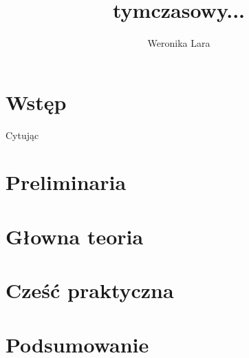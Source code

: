 \documentclass[10pt,a4paper]{report}
\author{Weronika Lara}
\title{tymczasowy...}
\begin{document}
\maketitle

\chapter{Wstęp}

Cytując \citep[Rozdział 3, sekcja 2]{palczewski2004rownania}

\chapter{Preliminaria}

\chapter{Głowna teoria}

\chapter{Cześć praktyczna}

\chapter{Podsumowanie}



\end{document}
